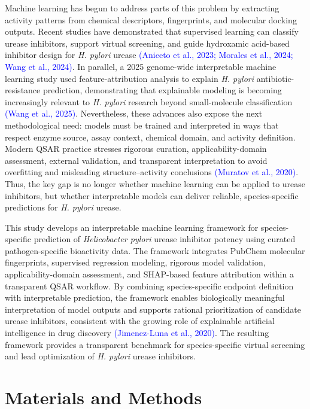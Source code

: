 \documentclass[11pt]{article}
\begin{document}
Machine learning has begun to address parts of this problem by extracting activity patterns from chemical descriptors, fingerprints, and molecular docking outputs. Recent studies have demonstrated that supervised learning can classify urease inhibitors, support virtual screening, and guide hydroxamic acid-based inhibitor design for \textit{H. pylori} urease \textcolor{blue}{(Aniceto et al., 2023; Morales et al., 2024; Wang et al., 2024)}. In parallel, a 2025 genome-wide interpretable machine learning study used feature-attribution analysis to explain \textit{H. pylori} antibiotic-resistance prediction, demonstrating that explainable modeling is becoming increasingly relevant to \textit{H. pylori} research beyond small-molecule classification \textcolor{blue}{(Wang et al., 2025)}. Nevertheless, these advances also expose the next methodological need: models must be trained and interpreted in ways that respect enzyme source, assay context, chemical domain, and activity definition. Modern QSAR practice stresses rigorous curation, applicability-domain assessment, external validation, and transparent interpretation to avoid overfitting and misleading structure--activity conclusions \textcolor{blue}{(Muratov et al., 2020)}. Thus, the key gap is no longer whether machine learning can be applied to urease inhibitors, but whether interpretable models can deliver reliable, species-specific predictions for \textit{H. pylori} urease.

This study develops an interpretable machine learning framework for species-specific prediction of \textit{Helicobacter pylori} urease inhibitor potency using curated pathogen-specific bioactivity data. The framework integrates PubChem molecular fingerprints, supervised regression modeling, rigorous model validation, applicability-domain assessment, and SHAP-based feature attribution within a transparent QSAR workflow. By combining species-specific endpoint definition with interpretable prediction, the framework enables biologically meaningful interpretation of model outputs and supports rational prioritization of candidate urease inhibitors, consistent with the growing role of explainable artificial intelligence in drug discovery \textcolor{blue}{(Jimenez-Luna et al., 2020)}. The resulting framework provides a transparent benchmark for species-specific virtual screening and lead optimization of \textit{H. pylori} urease inhibitors.


\section{Materials and Methods}
\end{document}
